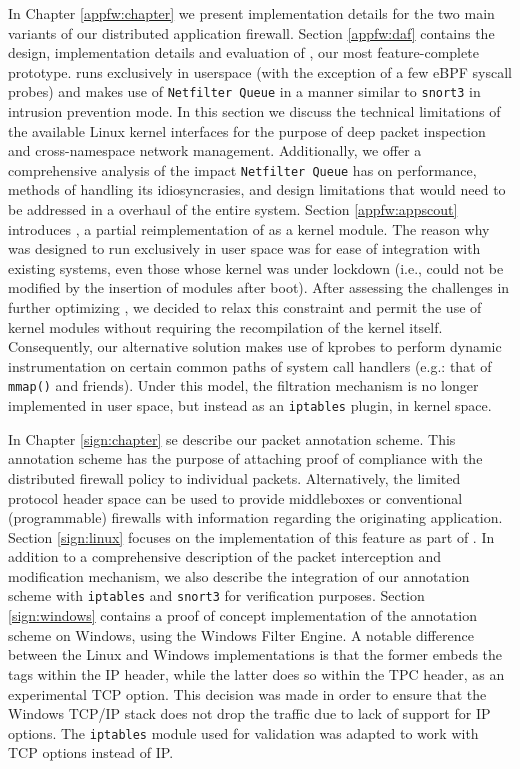 In Chapter \ref{appfw:chapter} we present implementation details for the two
main variants of our distributed application firewall. Section \ref{appfw:daf}
contains the design, implementation details and evaluation of \daf{}, our most
feature-complete prototype. \daf{} runs exclusively in userspace (with the
exception of a few eBPF syscall probes) and makes use of \texttt{Netfilter Queue}
in a manner similar to \texttt{snort3} in intrusion prevention mode. In this
section we discuss the technical limitations of the available Linux kernel
interfaces for the purpose of deep packet inspection and cross-namespace
network management. Additionally, we offer a comprehensive analysis of the
impact \texttt{Netfilter Queue} has on performance, methods of handling its
idiosyncrasies, and design limitations that would need to be addressed in a
overhaul of the entire system. Section \ref{appfw:appscout} introduces \scout{},
a partial reimplementation of \daf{} as a kernel module. The reason why \daf{}
was designed to run exclusively in user space was for ease of integration
with existing systems, even those whose kernel was under lockdown (i.e., could
not be modified by the insertion of modules after boot). After assessing the
challenges in further optimizing \daf{}, we decided to relax this constraint
and permit the use of kernel modules without requiring the recompilation of the
kernel itself. Consequently, our alternative solution makes use of kprobes to
perform dynamic instrumentation on certain common paths of system call handlers
(e.g.: that of \texttt{mmap()} and friends). Under this model, the filtration
mechanism is no longer implemented in user space, but instead as an \texttt{iptables}
plugin, in kernel space.

In Chapter \ref{sign:chapter} se describe our packet annotation scheme. This
annotation scheme has the purpose of attaching proof of compliance with the
distributed firewall policy to individual packets. Alternatively, the limited
protocol header space can be used to provide middleboxes or conventional
(programmable) firewalls with information regarding the originating application.
Section \ref{sign:linux} focuses on the implementation of this feature as part
of \daf{}. In addition to a comprehensive description of the packet interception
and modification mechanism, we also describe the integration of our annotation
scheme with \texttt{iptables} and \texttt{snort3} for verification purposes.
Section \ref{sign:windows} contains a proof of concept implementation of the
annotation scheme on Windows, using the Windows Filter Engine. A notable
difference between the Linux and Windows implementations is that the former
embeds the tags within the IP header, while the latter does so within the TPC
header, as an experimental TCP option. This decision was made in order to ensure
that the Windows TCP/IP stack does not drop the traffic due to lack of support
for IP options. The \texttt{iptables} module used for validation was adapted to
work with TCP options instead of IP.

